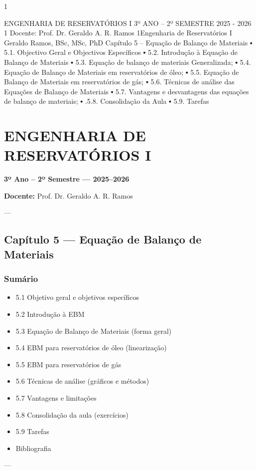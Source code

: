 \documentclass[11pt,a4paper]{article}
\begin{document}
1



ENGENHARIA DE RESERVATÓRIOS I
3º ANO – 2º SEMESTRE
2025 - 2026
1
Docente: Prof. Dr. Geraldo A. R. Ramos
1Engenharia de Reservatórios I
Geraldo Ramos, BSc, MSc, PhD
Capítulo 5 – Equação de Balanço de Materiais
▪ 5.1. Objectivo Geral e Objectivos Específicos
▪ 5.2. Introdução à Equação de Balanço de Materiais
▪ 5.3. Equação de balanço de materiais Generalizada;
▪ 5.4. Equação de Balanço de Materiais em reservatórios de óleo;
▪ 5.5. Equação de Balanço de Materiais em reservatórios de gás;
▪ 5.6. Técnicas de análise das Equações de Balanço de Materiais
▪ 5.7. Vantagens e desvantagens das equações de balanço de materiais;
▪ .5.8. Consolidação da Aula
▪ 5.9. Tarefas
\section{ENGENHARIA DE RESERVATÓRIOS I}
 \textbf{3º Ano – 2º Semestre — 2025–2026}

 \textbf{Docente:} Prof. Dr. Geraldo A. R. Ramos

 ---

\subsection{Capítulo 5 — Equação de Balanço de Materiais}

\subsubsection{Sumário}
\begin{itemize}
\item 5.1 Objetivo geral e objetivos específicos
\item 5.2 Introdução à EBM
\item 5.3 Equação de Balanço de Materiais (forma geral)
\item 5.4 EBM para reservatórios de óleo (linearização)
\item 5.5 EBM para reservatórios de gás
\item 5.6 Técnicas de análise (gráficos e métodos)
\item 5.7 Vantagens e limitações
\item 5.8 Consolidação da aula (exercícios)
\item 5.9 Tarefas
\item Bibliografia
\end{itemize}

---
\end{document}
